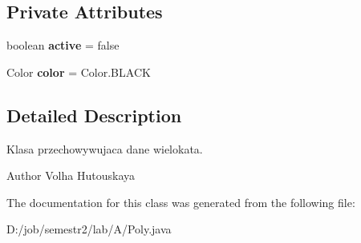 \subsection*{Private Attributes}
\begin{DoxyCompactItemize}
\item 
\mbox{\label{class_poly_af7a3aa122a5eaf1bf3d9eb95750ce536}} 
boolean {\bfseries active} = false
\item 
\mbox{\label{class_poly_a8fa0ee493b8d5c0d20612acee885b3a9}} 
Color {\bfseries color} = Color.\+B\+L\+A\+CK
\end{DoxyCompactItemize}


\subsection{Detailed Description}
Klasa przechowywujaca dane wielokata.

\begin{DoxyAuthor}{Author}
Volha Hutouskaya 
\end{DoxyAuthor}


The documentation for this class was generated from the following file\+:\begin{DoxyCompactItemize}
\item 
D\+:/job/semestr2/lab/\+A/Poly.\+java\end{DoxyCompactItemize}
